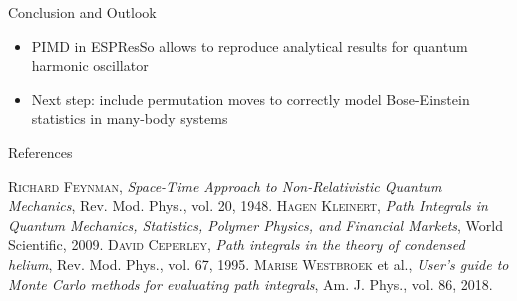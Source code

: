 \documentclass[final,hyperref={pdfpagelabels=false}]{beamer}
\begin{document}
\begin{frame}[t]
\begin{columns}[t]
\begin{column}{.48\textwidth}
\begin{block}{Conclusion and Outlook}
\begin{itemize}
\item PIMD in ESPResSo allows to reproduce analytical results for quantum harmonic oscillator
\item Next step: include permutation moves to correctly model Bose-Einstein statistics in many-body systems
\end{itemize}
\end{block}

\vspace{-0.05cm}
\begin{block}{References}
\begin{thebibliography}{9}
{
\textsc{Richard Feynman},
\emph{Space-Time Approach to Non-Relativistic Quantum Mechanics}, 
Rev. Mod. Phys.,
vol. 20,
1948.
}
{
\textsc{Hagen Kleinert},
\emph{Path Integrals in Quantum Mechanics, Statistics, Polymer Physics, and Financial Markets}, 
World Scientific,
2009.
}
{
\textsc{David Ceperley},
\emph{Path integrals in the theory of condensed helium}, 
Rev. Mod. Phys.,
vol. 67,
1995.
}
{
\textsc{Marise Westbroek} et al.,
\emph{User's guide to Monte Carlo methods for evaluating path integrals}, 
Am. J. Phys.,
vol. 86,
2018.
}
\end{thebibliography}
\end{block}



\end{column}

\end{columns}




\end{frame} %
\end{document}
